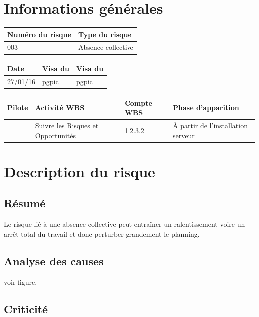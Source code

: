 \section*{Informations générales}
 
\begin{table}[h]
\centering
	\begin{tabularx}{16.8cm}{|X|X|}
	\hline
	Numéro du risque & Type du risque \\
	\hline
	003 & Absence collective \\
	\hline
	\end{tabularx}
\end{table}

\begin{table}[h]
\centering
	\begin{tabularx}{12.8cm}{|X|X|X|}
	\hline
	Date & Visa du \RQ & Visa du \CP \\
	\hline
	 27/01/16 & pgpic & pgpic \\
	\hline
	\end{tabularx}
\end{table}

\begin{table}[h]
\centering
	\begin{tabularx}{12.8cm}{|X|X|X|X|}
	\hline
	Pilote & Activité WBS & Compte WBS & Phase d'apparition \\
	\hline
	 \Pierre & Suivre les Risques et Opportunités & 1.2.3.2 & À partir de l’installation serveur\\
	\hline
	\end{tabularx}
\end{table}

\section*{Description du risque}

\subsection*{Résumé}
	Le risque lié à une absence collective peut entraîner un ralentissement voire un arrêt total du travail et donc perturber grandement le planning.
	
\subsection*{Analyse des causes}
	voir figure.

\subsection*{Criticité}

